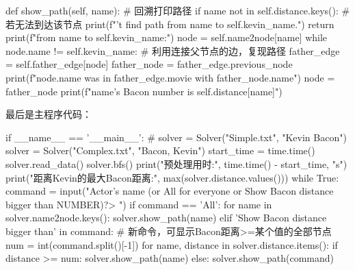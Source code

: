 \documentclass[12pt, a4paper, oneside]{ctexart}
\numberwithin{equation}{section}  %
\begin{document}
\begin{pythoncode}
    def show_path(self, name):  # 回溯打印路径
        if name not in self.distance.keys():  # 若无法到达该节点
            print(f"\nCan't find path from {name} to {self.kevin_name}.")
            return
        print(f"\nPath from {name} to {self.kevin_name}:")
        node = self.name2node[name]
        while node.name != self.kevin_name:  # 利用连接父节点的边，复现路径
            father_edge = self.father_edge[node]
            father_node = father_edge.previous_node
            print(f"{node.name} was in {father_edge.movie} with {father_node.name}")
            node = father_node
        print(f"{name}'s Bacon number is {self.distance[name]}")
\end{pythoncode}
最后是主程序代码：
\begin{pythoncode}
if __name__ == '__main__':
    # solver = Solver("Simple.txt", "Kevin Bacon")
    solver = Solver("Complex.txt", "Bacon, Kevin")
    start_time = time.time()
    solver.read_data()
    solver.bfs()
    print("预处理用时:", time.time() - start_time, "s")
    print("距离Kevin的最大Bacon距离:", max(solver.distance.values()))
    while True:
        command = input("Actor's name (or All for everyone or Show Bacon distance bigger than NUMBER)?\n> ")
        if command == 'All':
            for name in solver.name2node.keys():
                solver.show_path(name)
        elif 'Show Bacon distance bigger than' in command:  # 新命令，可显示Bacon距离>=某个值的全部节点
            num = int(command.split()[-1])
            for name, distance in solver.distance.items():
                if distance >= num:
                    solver.show_path(name)
        else:
            solver.show_path(command)
\end{pythoncode}
\end{document}
